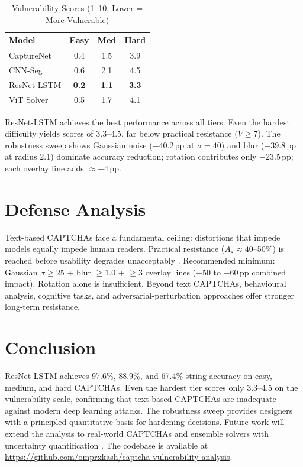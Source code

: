 ﻿\documentclass[conference]{IEEEtran}
\begin{document}
\begin{table}[htbp]
\caption{Vulnerability Scores (1--10, Lower = More Vulnerable)}
\begin{center}
\begin{tabular}{|l|c|c|c|}
\hline
\textbf{Model} & \textbf{Easy} & \textbf{Med} & \textbf{Hard} \\
\hline
CaptureNet  & 0.4 & 1.5 & 3.9 \\
\hline
CNN-Seg     & 0.6 & 2.1 & 4.5 \\
\hline
ResNet-LSTM & \textbf{0.2} & \textbf{1.1} & \textbf{3.3} \\
\hline
ViT Solver  & 0.5 & 1.7 & 4.1 \\
\hline
\end{tabular}
\label{tab:vscore_tbl}
\end{center}
\end{table}

ResNet-LSTM achieves the best performance across all tiers. Even the hardest difficulty yields scores of 3.3--4.5, far below practical resistance ($V\geq7$). The robustness sweep shows Gaussian noise ($-40.2$\,pp at $\sigma{=}40$) and blur ($-39.8$\,pp at radius 2.1) dominate accuracy reduction; rotation contributes only $-23.5$\,pp; each overlay line adds $\approx-4$\,pp.

\section{Defense Analysis}
Text-based CAPTCHAs face a fundamental ceiling: distortions that impede models equally impede human readers. Practical resistance ($A_s\approx40$--50\%) is reached before usability degrades unacceptably \cite{b7}. Recommended minimum: Gaussian $\sigma\geq25$ + blur $\geq1.0$ + $\geq3$ overlay lines ($-50$ to $-60$\,pp combined impact). Rotation alone is insufficient. Beyond text CAPTCHAs, behavioural analysis, cognitive tasks, and adversarial-perturbation approaches \cite{b7,b8} offer stronger long-term resistance.

\section{Conclusion}
ResNet-LSTM achieves 97.6\%, 88.9\%, and 67.4\% string accuracy on easy, medium, and hard CAPTCHAs. Even the hardest tier scores only 3.3--4.5 on the vulnerability scale, confirming that text-based CAPTCHAs are inadequate against modern deep learning attacks. The robustness sweep provides designers with a principled quantitative basis for hardening decisions. Future work will extend the analysis to real-world CAPTCHAs and ensemble solvers with uncertainty quantification \cite{b9}. The codebase is available at \url{https://github.com/omprxkash/captcha-vulnerability-analysis}.
\end{document}
